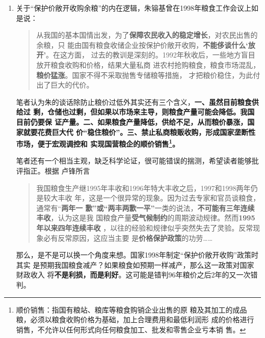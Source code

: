 \begin{enumerate}
\item 关于“保护价敞开收购余粮”的内在逻辑，朱镕基曾在1998年粮食工作会议上如是说：
  \begin{quotation}
    从我国的基本国情出发，为了\textbf{保障农民收入的稳定增长}，对农民出售的余粮，只
    能由国有粮食收储企业按保护价敞开收购，\textbf{不能侈谈什么‘放开’}。在这方面，
    过去的教训是深刻的。1992年秋收后，一些地方盲目放开粮食收购和价格，结果大量私商
    进农村抢购粮食，粮食市场混乱，\textbf{粮价猛涨}。国家不得不采取抛售专储粮等措施，
    才把粮价稳住，为此付出了巨大的代价。\cite{zhuchangkai}
  \end{quotation}

  笔者认为朱的谈话除防止粮价过低外其实还有三个含义，\textbf{一、虽然目前粮食供给过
    剩，仓储也过剩，但如果以市场来主导，则粮食产量可能会降低。我国目前仍要保
    证产量。二、如果粮食产量降低，供给不足，从而粮价暴涨，国家就要花费巨大代
    价“稳住粮价”。三、禁止私商粮贩收购，形成国家垄断性市场，便于宏观调控和
    实现国营粮企的顺价销售\footnote{顺价销售：指国有粮站、粮库等粮食购销企业出售的原
      粮及其加工的成品粮，必须以粮食收购价格为基础，加上合理费用和最低利润形
      成的价格进行销售，不允许以任何形式向任何粮食加工、批发和零售企业亏本销
      售。}。}


  笔者还有一个相当主观，缺乏科学论证，很可能错误的揣测，希望读者能够批评指正。根据
  卢锋所言
  \begin{quotation}
    我国粮食生产继1995年丰收和1996年特大丰收之后，1997和1998两年仍是较大丰收
    年，这是一个很异常的现象。因为过去专家和官员谈粮食，通常有“\textbf{两年一
      歉”或“两丰两歉一平”}一类的说法，\textbf{不可能有三年连续丰收}，认为这是我
    国粮食产量\textbf{受气候制约}的周期波动规律。然而\textbf{1995年以来四年连续丰收}%
    ，以往的经验和规律似乎突然失去了灵验。反常现象必有反常原因，这应当主要
    是\textbf{价格保护政策}的功劳……
  \end{quotation}
  那么，是不是可以换一个角度来想。国家1998年制定“保护价敞开收购”政策时其实
  是预期我国粮食减产？如果粮食如预期一样减产，那么这一政策对国家财政收入
  将\textbf{不是利损，而是利好}。这可能是错判96年粮价之后2年的又一次错判。



\end{enumerate}
